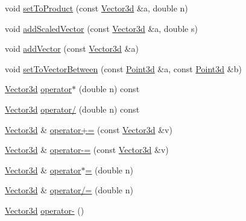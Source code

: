 \begin{DoxyCompactItemize}
\item 
void \hyperlink{classCartWheel_1_1Math_1_1Vector3d_af1946753f78a74646b055b8280d95a97}{setToProduct} (const \hyperlink{classCartWheel_1_1Math_1_1Vector3d}{Vector3d} \&a, double n)
\item 
void \hyperlink{classCartWheel_1_1Math_1_1Vector3d_a8ef8f6c9b8a37b326230866271036129}{addScaledVector} (const \hyperlink{classCartWheel_1_1Math_1_1Vector3d}{Vector3d} \&a, double s)
\item 
void \hyperlink{classCartWheel_1_1Math_1_1Vector3d_a73161833fe21aebbdaebaaa8efd95603}{addVector} (const \hyperlink{classCartWheel_1_1Math_1_1Vector3d}{Vector3d} \&a)
\item 
void \hyperlink{classCartWheel_1_1Math_1_1Vector3d_a04d88c2c27b0289d67dddbb9247f181d}{setToVectorBetween} (const \hyperlink{classCartWheel_1_1Math_1_1Point3d}{Point3d} \&a, const \hyperlink{classCartWheel_1_1Math_1_1Point3d}{Point3d} \&b)
\item 
\hyperlink{classCartWheel_1_1Math_1_1Vector3d}{Vector3d} \hyperlink{classCartWheel_1_1Math_1_1Vector3d_a584d0e2e0f2ca9ade782644458e524a7}{operator$\ast$} (double n) const 
\item 
\hyperlink{classCartWheel_1_1Math_1_1Vector3d}{Vector3d} \hyperlink{classCartWheel_1_1Math_1_1Vector3d_ab92953a8944fc4c5ca48474e2e78b28f}{operator/} (double n) const 
\item 
\hyperlink{classCartWheel_1_1Math_1_1Vector3d}{Vector3d} \& \hyperlink{classCartWheel_1_1Math_1_1Vector3d_adcfc67885472fb1b8b88e74539303dfb}{operator+=} (const \hyperlink{classCartWheel_1_1Math_1_1Vector3d}{Vector3d} \&v)
\item 
\hyperlink{classCartWheel_1_1Math_1_1Vector3d}{Vector3d} \& \hyperlink{classCartWheel_1_1Math_1_1Vector3d_a0ffd89490d43e2331f4a04885926f46f}{operator-\/=} (const \hyperlink{classCartWheel_1_1Math_1_1Vector3d}{Vector3d} \&v)
\item 
\hyperlink{classCartWheel_1_1Math_1_1Vector3d}{Vector3d} \& \hyperlink{classCartWheel_1_1Math_1_1Vector3d_a1052925e7cb8182658b5323b26f368ba}{operator$\ast$=} (double n)
\item 
\hyperlink{classCartWheel_1_1Math_1_1Vector3d}{Vector3d} \& \hyperlink{classCartWheel_1_1Math_1_1Vector3d_a423132ffd90c3e4a46565bd17aeace43}{operator/=} (double n)
\item 
\hyperlink{classCartWheel_1_1Math_1_1Vector3d}{Vector3d} \hyperlink{classCartWheel_1_1Math_1_1Vector3d_a2d6b8355acc0640eeab1d19e9692eee6}{operator-\/} ()
\item 

\end{DoxyCompactItemize}
